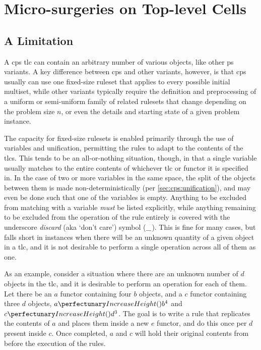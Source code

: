 \section{\label{sec:cps:microsurg}Micro-surgeries on  Top-level Cells}
\subsection{A Limitation}
A \gls{cps} \gls{tlc} can contain an arbitrary number of various objects, like other \gls{ps} variants.  A key difference between \gls{cps} and other variants, however, is that \gls{cps} usually can use one fixed-size \gls{ruleset} that applies to every possible initial multiset, while other variants typically require the definition and preprocessing of a uniform or semi-uniform family of related \glspl{ruleset} that change depending on the problem size \(n\), or even the details and starting state of a given problem instance.

The capacity for fixed-size \glspl{ruleset} is enabled primarily through the use of variables and unification, permitting the rules to adapt to the contents of the \glspl{tlc}.  This tends to be an all-or-nothing situation, though, in that a single variable usually matches to the entire contents of whichever \gls{tlc} or \gls{functor} it is specified in.  In the case of two or more variables in the same space, the split of the objects between them is made non-deterministically (per \cref{sec:cps:unification}), and may even be done such that one of the variables is empty.  Anything to be excluded from matching with a variable \emph{must} be listed explicitly, while anything remaining to be excluded from the operation of the rule entirely is covered with the underscore \emph{discard} (aka \textsf{`don't care'}) symbol (\(\_\)).  This is fine for many cases, but falls short in instances when there will be an unknown quantity of a given object in a \gls{tlc}, and it is not desirable to perform a single operation across all of them as one.

As an example, consider a situation where there are an unknown number of \(d\) objects in the \gls{tlc}, and it is desirable to perform an operation for each of them.  Let there be an \(a\) \gls{functor} containing four \(b\) objects, and a \(c\) \gls{functor} containing three \(d\) objects, \ie{} \(\cpfunc{a}{b^4}\) and \(\cpfunc{c}{d^3}\).  The goal is to write a rule that replicates the contents of \(a\) and places them inside a new \(e\) \gls{functor}, and do this once per \(d\) present inside \(c\).  Once completed, \(a\) and \(c\) will hold their original contents from before the execution of the rules.

